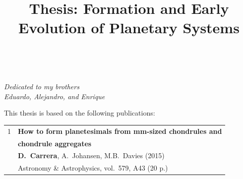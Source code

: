 \documentclass[11pt]{book}
\title{Thesis: Formation and Early Evolution of Planetary Systems}
\begin{document}





\newpage
\thispagestyle{empty} %
~
\vspace{140pt}
\begin{flushright}
\textit{Dedicated to my brothers\\Eduardo, Alejandro, and Enrique}
\end{flushright}


\cleardoublepage


\setcounter{page}{1} %
\setcounter{tocdepth}{1}
\tableofcontents


\newpage
{}
This thesis is based on the following publications:
\vspace{6mm}

\begin{tabular}{ll}
1   & \textbf{How to form planetesimals from mm-sized chondrules and}\\
    & \textbf{chondrule aggregates}\\[2mm]
    & \textbf{D.~Carrera}, A.~Johansen, M.B.~Davies (2015) \\
    & Astronomy \& Astrophysics, vol.~579, A43 (20 p.)\\[6mm]
\end{tabular}


\newpage
{}

\blindtext




\blindtext


\newpage
{}

\blindtext


\mainmatter           %
\setcounter{table}{0} %
\end{document}

